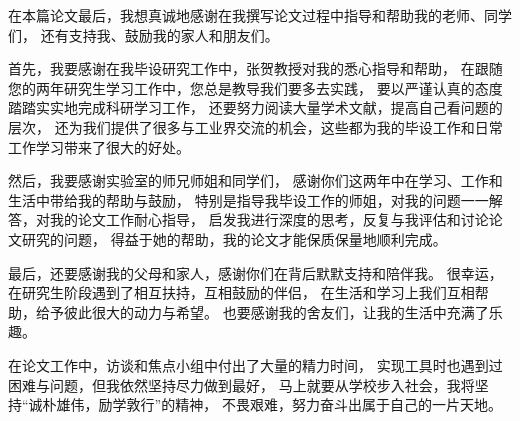 \documentclass[macfonts,master,oneside]{njuthesis}
\begin{document}
\begin{acknowledgement}
在本篇论文最后，我想真诚地感谢在我撰写论文过程中指导和帮助我的老师、同学们，
还有支持我、鼓励我的家人和朋友们。

首先，我要感谢在我毕设研究工作中，张贺教授对我的悉心指导和帮助，
在跟随您的两年研究生学习工作中，您总是教导我们要多去实践，
要以严谨认真的态度踏踏实实地完成科研学习工作，
还要努力阅读大量学术文献，提高自己看问题的层次，
还为我们提供了很多与工业界交流的机会，这些都为我的毕设工作和日常工作学习带来了很大的好处。

然后，我要感谢实验室的师兄师姐和同学们，
感谢你们这两年中在学习、工作和生活中带给我的帮助与鼓励，
特别是指导我毕设工作的师姐，对我的问题一一解答，对我的论文工作耐心指导，
启发我进行深度的思考，反复与我评估和讨论论文研究的问题，
得益于她的帮助，我的论文才能保质保量地顺利完成。

最后，还要感谢我的父母和家人，感谢你们在背后默默支持和陪伴我。
很幸运，在研究生阶段遇到了相互扶持，互相鼓励的伴侣，
在生活和学习上我们互相帮助，给予彼此很大的动力与希望。
也要感谢我的舍友们，让我的生活中充满了乐趣。

在论文工作中，访谈和焦点小组中付出了大量的精力时间，
实现工具时也遇到过困难与问题，但我依然坚持尽力做到最好，
马上就要从学校步入社会，我将坚持“诚朴雄伟，励学敦行”的精神，
不畏艰难，努力奋斗出属于自己的一片天地。
  
\end{acknowledgement}





\end{document}
